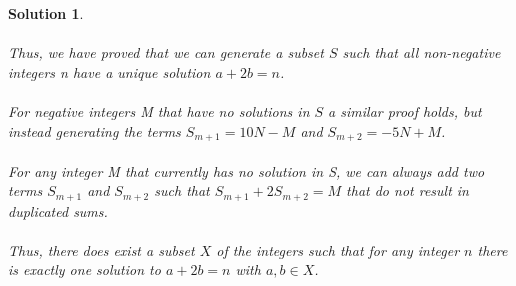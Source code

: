 \documentclass[12pt]{article}
\newtheorem*{solution*}{Solution}
\begin{document}
\begin{solution*}
\\ \\
Thus, we have proved that we can generate a subset $S$ such that all non-negative integers n have a unique solution $a + 2b = n$.
\\ \\
For negative integers M that have no solutions in $S$ a similar proof holds, but instead generating the terms $S_{m+1} = 10N - M$ and $S_{m+2} = -5N + M$.
\\ \\
For any integer M that currently has no solution in S, we can always add two terms $S_{m+1}$ and $S_{m+2}$ such that $S_{m+1} + 2S_{m+2} = M$ that do not result in duplicated sums.
\\ \\
Thus, there does exist a subset $X$ of the integers such that for any integer $n$ there is exactly one solution to $a + 2b = n$ with $a, b \in X$.
\end{solution*}
\end{document}
